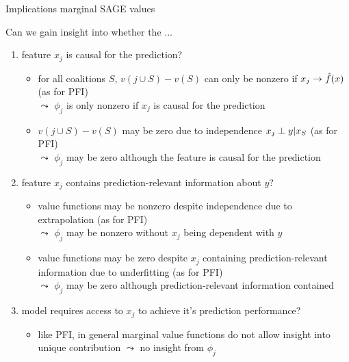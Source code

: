 \documentclass[11pt,compress,t,notes=noshow, aspectratio=169, xcolor=table]{beamer}
\begin{document}
\begin{frame}{Implications marginal SAGE values}

Can we gain insight into whether the ...

\begin{enumerate}
    \item<1> feature $x_j$ is causal for the prediction?    \begin{itemize}
      \item for all coalitions $S$, $v(j \cup S) - v(S)$ can only be nonzero if $x_j \rightarrow \fh(x)$ (as for PFI)\\
      $\leadsto$ $\phi_j$ is only nonzero if $x_j$ is causal for the prediction
      \item $v(j \cup S) - v(S)$ may be zero due to independence $x_j \indep y | x_S$ (as for PFI)\\
      $\leadsto$ $\phi_j$ may be zero although the feature is causal for the prediction
    \end{itemize}
    \item<2> feature $x_j$ contains prediction-relevant information about $y$?
    \begin{itemize}
      \item value functions may be nonzero despite independence due to extrapolation (as for PFI)\\
      $\leadsto$ $\phi_j$ may be nonzero without $x_j$ being dependent with $y$
      \item value functions may be zero despite $x_j$ containing prediction-relevant information due to underfitting (as for PFI)\\
      $\leadsto$ $\phi_j$ may be zero although prediction-relevant information contained
    \end{itemize}
    \item<3> model requires access to $x_j$ to achieve it's prediction performance?    
    \begin{itemize}
      \item like PFI, in general marginal value functions do not allow insight into unique contribution $\leadsto$ no insight from $\phi_j$
    \end{itemize}
\end{enumerate}

\end{frame}
%
\end{document}
